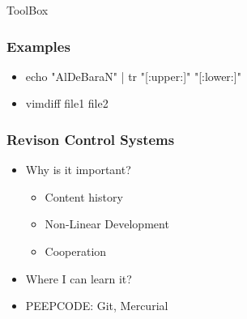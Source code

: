 \documentclass[fleqn]{beamer}
\begin{document}
\begin{section}{ToolBox}
\begin{frame}\frametitle{Examples}
  \begin{itemize}
    \item echo "AlDeBaraN" | tr "[:upper:]" "[:lower:]"
    \item vimdiff file1 file2
  \end{itemize}
  \end{frame}


  \begin{frame}\frametitle{Revison Control Systems}
  \begin{itemize}
    \item{Why is it important?}
      \begin{itemize}
      \item Content history
      \item Non-Linear Development
      \item Cooperation
      \end{itemize}
    \item{Where I can learn it?}
    \item PEEPCODE: Git, Mercurial
  \end{itemize}
  \end{frame}
\end{section}

\end{document}
